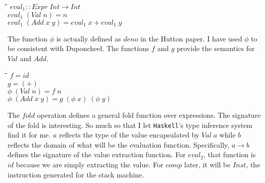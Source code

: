 \documentclass[10pt]{article}
\newlength{\lwidth}\setlength{\lwidth}{4.5cm}
\newlength{\cwidth}\setlength{\cwidth}{8mm} %
\newcommand{\Conid}[1]{\mathit{#1}}
\newcommand{\Varid}[1]{\mathit{#1}}
\begin{document}
\begin{tabbing}
\qquad\=\hspace{\lwidth}\=\hspace{\cwidth}\=\+\kill
${\Varid{eval}_1\mathbin{::}\Conid{Expr}\;\Conid{Int}\to \Conid{Int}}$\\
${\Varid{eval}_1\;(\Conid{Val}\;\Varid{n})\mathrel{=}\Varid{n}}$\\
${\Varid{eval}_1\;(\Conid{Add}\;\Varid{x}\;\Varid{y})\mathrel{=}\Varid{eval}_1\;\Varid{x}\mathbin{+}\Varid{eval}_1\;\Varid{y}}$
\end{tabbing}
The function \ensuremath{\Varid{\phi}} is actually defined as \ensuremath{\Varid{deno}} in the Hutton paper.
I have used \ensuremath{\Varid{\phi}} to be consistent with Duponcheel.  The functions
\ensuremath{\Varid{f}} and \ensuremath{\Varid{g}} provide the semantics for \ensuremath{\Conid{Val}} and \ensuremath{\Conid{Add}}.

\begin{tabbing}
\qquad\=\hspace{\lwidth}\=\hspace{\cwidth}\=\+\kill
${\Varid{f}\mathrel{=}\Varid{id}}$\\
${\Varid{g}\mathrel{=}(\mathbin{+})}$\\
${}$\\
${\Varid{\phi}\;(\Conid{Val}\;\Varid{n})\mathrel{=}\Varid{f}\;\Varid{n}}$\\
${\Varid{\phi}\;(\Conid{Add}\;\Varid{x}\;\Varid{y})\mathrel{=}\Varid{g}\;(\Varid{\phi}\;\Varid{x})\;(\Varid{\phi}\;\Varid{y})}$
\end{tabbing}
The \ensuremath{\Varid{fold}} operation defines a general fold function over expressions.
The signature of the fold is interesting.  So much so that I let
\texttt{Haskell}'s type inference system find it for me.  \ensuremath{\Varid{a}} reflects
the type of the value encapsulated by \ensuremath{\Conid{Val}\;\Varid{a}} while \ensuremath{\Varid{b}} reflects the
domain of what will be the evaluation function.  Specifically, \ensuremath{\Varid{a}\to \Varid{b}}
defines the signature of the value extraction function.  For \ensuremath{\Varid{eval}_2},
that function is \ensuremath{\Varid{id}} because we are simply extracting the value.  For
\ensuremath{\Varid{comp}} later, it will be \ensuremath{\Conid{Inst}}, the instruction generated for the
stack machine.
\end{document}
